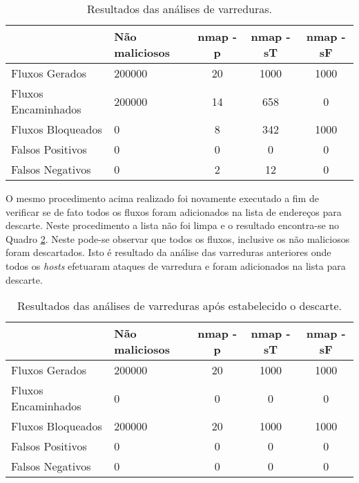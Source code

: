 \begin{table}[H]
\centering
\caption{Resultados das análises de varreduras.}
\label{fig:e1}
\begin{tabular}{|l|l|c|c|c|}
\hline
\multicolumn{1}{|c|}{} & Não maliciosos & nmap -p & nmap -sT & nmap -sF \\ \hline
Fluxos Gerados         & 200000          & 20      & 1000     & 1000     \\ \hline
Fluxos Encaminhados    & 200000          & 14      & 658      & 0        \\ \hline
Fluxos Bloqueados      & 0              & 8       & 342      & 1000     \\ \hline
Falsos Positivos       & 0              & 0       & 0        & 0        \\ \hline
Falsos Negativos       & 0              & 2       & 12       & 0        \\ \hline
\end{tabular}
\end{table}

O mesmo procedimento acima realizado foi novamente executado a fim de verificar se de fato todos os fluxos foram adicionados na lista de endereços para descarte. Neste procedimento a lista não foi limpa e o resultado encontra-se no Quadro \ref{fig:e2}. Neste pode-se observar que todos os fluxos, inclusive os não maliciosos foram descartados. Isto é resultado da análise das varreduras anteriores onde todos os \textit{hosts} efetuaram ataques de varredura e foram adicionados na lista para descarte.


\begin{table}[H]
\centering
\caption{Resultados das análises de varreduras após estabelecido o descarte.}
\label{fig:e2}
\begin{tabular}{|l|l|c|c|c|}
\hline
\multicolumn{1}{|c|}{} & Não maliciosos & nmap -p & nmap -sT & nmap -sF \\ \hline
Fluxos Gerados         & 200000          & 20      & 1000     & 1000     \\ \hline
Fluxos Encaminhados    & 0               & 0      & 0      & 0        \\ \hline
Fluxos Bloqueados      & 200000         & 20       & 1000      & 1000     \\ \hline
Falsos Positivos       & 0              & 0       & 0        & 0        \\ \hline
Falsos Negativos       & 0              & 0       & 0       & 0        \\ \hline
\end{tabular}
\end{table}

